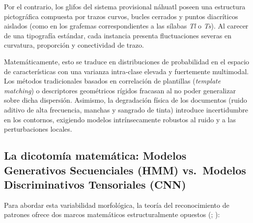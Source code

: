 \documentclass[
  spanish,
  us-letterpaper,
]{scrreprt}
\theoremstyle{definition}
\theoremstyle{remark}
\begin{document}
Por el contrario, los glifos del sistema provisional náhuatl poseen una
estructura pictográfica compuesta por trazos curvos, bucles cerrados y
puntos diacríticos aislados (como en los grafemas correspondientes a las
sílabas \emph{Tl} o \emph{Ts}). Al carecer de una tipografía estándar,
cada instancia presenta fluctuaciones severas en curvatura, proporción y
conectividad de trazo.

Matemáticamente, esto se traduce en distribuciones de probabilidad en el
espacio de características con una varianza intra-clase elevada y
fuertemente multimodal. Los métodos tradicionales basados en correlación
de plantillas (\emph{template matching}) o descriptores geométricos
rígidos fracasan al no poder generalizar sobre dicha dispersión.
Asimismo, la degradación física de los documentos (ruido aditivo de alta
frecuencia, manchas y sangrado de tinta) introduce incertidumbre en los
contornos, exigiendo modelos intrínsecamente robustos al ruido y a las
perturbaciones locales.

\subsection{La dicotomía matemática: Modelos Generativos Secuenciales
(HMM) vs.~Modelos Discriminativos Tensoriales
(CNN)}\label{la-dicotomuxeda-matemuxe1tica-modelos-generativos-secuenciales-hmm-vs.-modelos-discriminativos-tensoriales-cnn}

Para abordar esta variabilidad morfológica, la teoría del reconocimiento
de patrones ofrece dos marcos matemáticos estructuralmente opuestos
(;
):
\end{document}
